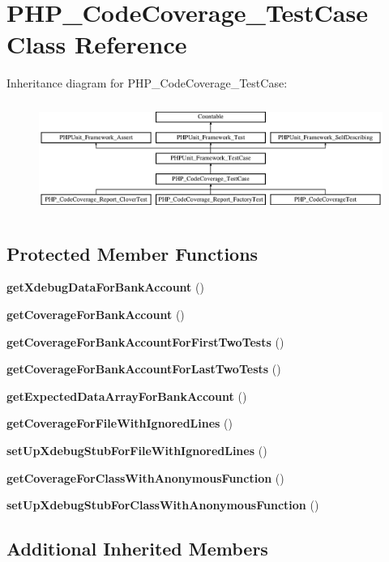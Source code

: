\section{P\+H\+P\+\_\+\+Code\+Coverage\+\_\+\+Test\+Case Class Reference}
\label{class_p_h_p___code_coverage___test_case}
Inheritance diagram for P\+H\+P\+\_\+\+Code\+Coverage\+\_\+\+Test\+Case\+:\begin{figure}[H]
\begin{center}
\leavevmode
\includegraphics[height=3.645833cm]{class_p_h_p___code_coverage___test_case}
\end{center}
\end{figure}
\subsection*{Protected Member Functions}
\begin{DoxyCompactItemize}
\item 
{\bf get\+Xdebug\+Data\+For\+Bank\+Account} ()
\item 
{\bf get\+Coverage\+For\+Bank\+Account} ()
\item 
{\bf get\+Coverage\+For\+Bank\+Account\+For\+First\+Two\+Tests} ()
\item 
{\bf get\+Coverage\+For\+Bank\+Account\+For\+Last\+Two\+Tests} ()
\item 
{\bf get\+Expected\+Data\+Array\+For\+Bank\+Account} ()
\item 
{\bf get\+Coverage\+For\+File\+With\+Ignored\+Lines} ()
\item 
{\bf set\+Up\+Xdebug\+Stub\+For\+File\+With\+Ignored\+Lines} ()
\item 
{\bf get\+Coverage\+For\+Class\+With\+Anonymous\+Function} ()
\item 
{\bf set\+Up\+Xdebug\+Stub\+For\+Class\+With\+Anonymous\+Function} ()
\end{DoxyCompactItemize}
\subsection*{Additional Inherited Members}


